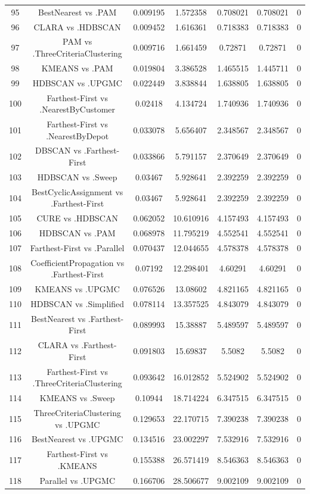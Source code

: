\documentclass[a4paper,10pt]{article}
\begin{document}
\begin{landscape}
\begin{table}[!htp]
\begin{tabular}{ccccccc}
95&BestNearest vs .PAM&0.009195&1.572358&0.708021&0.708021&0\\
96&CLARA vs .HDBSCAN&0.009452&1.616361&0.718383&0.718383&0\\
97&PAM vs .ThreeCriteriaClustering&0.009716&1.661459&0.72871&0.72871&0\\
98&KMEANS vs .PAM&0.019804&3.386528&1.465515&1.445711&0\\
99&HDBSCAN vs .UPGMC&0.022449&3.838844&1.638805&1.638805&0\\
100&Farthest-First vs .NearestByCustomer&0.02418&4.134724&1.740936&1.740936&0\\
101&Farthest-First vs .NearestByDepot&0.033078&5.656407&2.348567&2.348567&0\\
102&DBSCAN vs .Farthest-First&0.033866&5.791157&2.370649&2.370649&0\\
103&HDBSCAN vs .Sweep&0.03467&5.928641&2.392259&2.392259&0\\
104&BestCyclicAssignment vs .Farthest-First&0.03467&5.928641&2.392259&2.392259&0\\
105&CURE vs .HDBSCAN&0.062052&10.610916&4.157493&4.157493&0\\
106&HDBSCAN vs .PAM&0.068978&11.795219&4.552541&4.552541&0\\
107&Farthest-First vs .Parallel&0.070437&12.044655&4.578378&4.578378&0\\
108&CoefficientPropagation vs .Farthest-First&0.07192&12.298401&4.60291&4.60291&0\\
109&KMEANS vs .UPGMC&0.076526&13.08602&4.821165&4.821165&0\\
110&HDBSCAN vs .Simplified&0.078114&13.357525&4.843079&4.843079&0\\
111&BestNearest vs .Farthest-First&0.089993&15.38887&5.489597&5.489597&0\\
112&CLARA vs .Farthest-First&0.091803&15.69837&5.5082&5.5082&0\\
113&Farthest-First vs .ThreeCriteriaClustering&0.093642&16.012852&5.524902&5.524902&0\\
114&KMEANS vs .Sweep&0.10944&18.714224&6.347515&6.347515&0\\
115&ThreeCriteriaClustering vs .UPGMC&0.129653&22.170715&7.390238&7.390238&0\\
116&BestNearest vs .UPGMC&0.134516&23.002297&7.532916&7.532916&0\\
117&Farthest-First vs .KMEANS&0.155388&26.571419&8.546363&8.546363&0\\
118&Parallel vs .UPGMC&0.166706&28.506677&9.002109&9.002109&0\\

\end{tabular}
\end{table}
\end{landscape}
\end{document}
